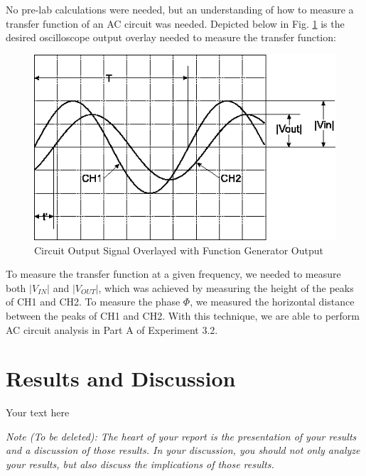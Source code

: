\documentclass[10pt]{article}
\begin{document}
No pre-lab calculations were needed, but an understanding of how to measure a transfer function of an AC circuit was needed. Depicted below in Fig. \ref{measurement} is the desired oscilloscope output overlay needed to measure the transfer function:
\begin{centering}
	\begin{figure} [H]
		\centering
		\includegraphics[scale=0.5]{images/measurementexample.png}
		\caption{Circuit Output Signal Overlayed with Function Generator Output}
		\label{measurement}
	\end{figure}
\end{centering}

To measure the transfer function at a given frequency, we needed to measure both $|V_{IN}|$ and $|V_{OUT}|$, which was achieved by measuring the height of the peaks of CH1 and CH2. To measure the phase $\Phi$, we measured the horizontal distance between the peaks of CH1 and CH2. With this technique, we are able to perform AC circuit analysis in Part A of Experiment 3.2. 
\medskip


\section{Results and Discussion}

Your text here

\medskip

\textit{Note (To be deleted): The heart of your report is the presentation of your results and a discussion of those results. In your discussion, you should not only analyze your results, but also discuss the implications of those results.}
\end{document}
